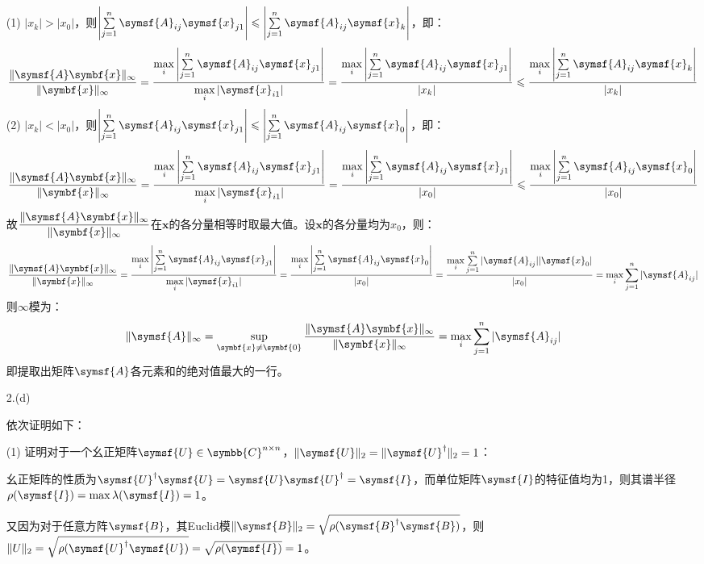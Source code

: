 \documentclass[a4paper]{article}
\renewcommand\mathsf{\symsf}
\renewcommand{\bm}{\symbf}
\begin{document}
\begin{enumerate}
(1) $|x_k|>|x_0|$，则$\left|\sum\limits_{j=1}^n \mathsf{A}_{ij}\mathsf{x}_{j1}\right|\leqslant\left|\sum\limits_{j=1}^n \mathsf{A}_{ij}\mathsf{x}_k\right|$，即：
\[
    \frac{\|\mathsf{A}\bm{x}\|_\infty}{\|\bm{x}\|_\infty}
    = \frac{\max\limits_i\left|\sum\limits_{j=1}^n \mathsf{A}_{ij}\mathsf{x}_{j1}\right|}{\max\limits_i|\mathsf{x}_{i1}|}
    = \frac{\max\limits_i\left|\sum\limits_{j=1}^n \mathsf{A}_{ij}\mathsf{x}_{j1}\right|}{|x_k|}
    \leqslant \frac{\max\limits_i\left|\sum\limits_{j=1}^n \mathsf{A}_{ij}\mathsf{x}_k\right|}{|x_k|}
\]
(2) $|x_k|<|x_0|$，则$\left|\sum\limits_{j=1}^n \mathsf{A}_{ij}\mathsf{x}_{j1}\right|\leqslant\left|\sum\limits_{j=1}^n \mathsf{A}_{ij}\mathsf{x}_0\right|$，即：
\[
    \frac{\|\mathsf{A}\bm{x}\|_\infty}{\|\bm{x}\|_\infty}
    = \frac{\max\limits_i\left|\sum\limits_{j=1}^n \mathsf{A}_{ij}\mathsf{x}_{j1}\right|}{\max\limits_i|\mathsf{x}_{i1}|}
    = \frac{\max\limits_i\left|\sum\limits_{j=1}^n \mathsf{A}_{ij}\mathsf{x}_{j1}\right|}{|x_0|}
    \leqslant \frac{\max\limits_i\left|\sum\limits_{j=1}^n \mathsf{A}_{ij}\mathsf{x}_0\right|}{|x_0|}
\]
故$\dfrac{\|\mathsf{A}\bm{x}\|_\infty}{\|\bm{x}\|_\infty}$在$\bm{x}$的各分量相等时取最大值。设$\bm{x}$的各分量均为$x_0$，则：
\[
    \frac{\|\mathsf{A}\bm{x}\|_\infty}{\|\bm{x}\|_\infty}
    = \frac{\max\limits_i\left|\sum\limits_{j=1}^n \mathsf{A}_{ij}\mathsf{x}_{j1}\right|}{\max\limits_i|\mathsf{x}_{i1}|}
    = \frac{\max\limits_i\left|\sum\limits_{j=1}^n \mathsf{A}_{ij}\mathsf{x}_0\right|}{|x_0|}
    = \frac{\max\limits_i\sum\limits_{j=1}^n |\mathsf{A}_{ij}||\mathsf{x}_0|}{|x_0|} 
    = \max\limits_i\sum\limits_{j=1}^n |\mathsf{A}_{ij}|
\]
则$\infty$模为：
\[
    \|\mathsf{A}\|_\infty
    = \sup\limits_{\bm{x}\neq\bm{0}}\frac{\|\mathsf{A}\bm{x}\|_\infty}{\|\bm{x}\|_\infty}
    = \max\limits_i\sum\limits_{j=1}^n |\mathsf{A}_{ij}|
\]
即提取出矩阵$\mathsf{A}$各元素和的绝对值最大的一行。

\item[2.(d)]

依次证明如下：

(1) 证明对于一个幺正矩阵$\mathsf{U}\in\symbb{C}^{n\times n}$，$\|\mathsf{U}\|_2=\|\mathsf{U}^\dagger\|_2=1$：

幺正矩阵的性质为$\mathsf{U}^\dagger\mathsf{U}=\mathsf{U}\mathsf{U}^\dagger=\mathsf{I}$，而单位矩阵$\mathsf{I}$的特征值均为1，则其谱半径$\rho(\mathsf{I})=\max\lambda(\mathsf{I})=1$。

又因为对于任意方阵$\mathsf{B}$，其Euclid模$\|\mathsf{B}\|_2=\sqrt{\rho(\mathsf{B}^\dagger\mathsf{B})}$，则$\|U\|_2=\sqrt{\rho(\mathsf{U}^\dagger\mathsf{U})}=\sqrt{\rho(\mathsf{I})}=1$。


\end{enumerate}
\end{document}
